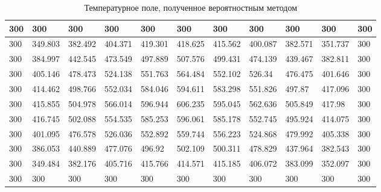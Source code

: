 \documentclass[12pt, a4paper]{article}
\begin{document}
\begin{table}[ht]
	\small
	\caption{Температурное поле, полученное вероятностным методом}
	\label{tbl:probability}
	\begin{tabular}{|l|l|l|l|l|l|l|l|l|l|l|}
		\hline
		300 & 300     & 300     & 300     & 300     & 300     & 300     & 300     & 300     & 300     & 300 \\ \hline
		300 & 349.803 & 382.492 & 404.371 & 419.301 & 418.625 & 415.562 & 400.087 & 382.571 & 351.737 & 300 \\ \hline
		300 & 384.997 & 442.545 & 473.549 & 497.889 & 507.576 & 499.431 & 474.139 & 439.467 & 382.811 & 300 \\ \hline
		300 & 405.146 & 478.473 & 524.138 & 551.763 & 564.484 & 552.102 & 526.34  & 476.475 & 401.646 & 300 \\ \hline
		300 & 414.462 & 498.766 & 552.034 & 584.046 & 594.611 & 583.298 & 551.826 & 497.87  & 417.096 & 300 \\ \hline
		300 & 415.855 & 504.978 & 566.014 & 596.944 & 606.235 & 595.045 & 562.636 & 505.849 & 417.98  & 300 \\ \hline
		300 & 416.745 & 502.088 & 554.535 & 585.253 & 596.061 & 585.178 & 552.745 & 495.924 & 414.075 & 300 \\ \hline
		300 & 401.095 & 476.578 & 526.036 & 552.892 & 559.744 & 556.223 & 524.868 & 479.992 & 405.338 & 300 \\ \hline
		300 & 386.053 & 440.889 & 477.076 & 496.92  & 502.109 & 500.311 & 478.829 & 437.964 & 382.543 & 300 \\ \hline
		300 & 349.484 & 382.176 & 405.716 & 415.766 & 414.571 & 415.185 & 406.072 & 383.099 & 352.097 & 300 \\ \hline
		300 & 300     & 300     & 300     & 300     & 300     & 300     & 300     & 300     & 300     & 300 \\ \hline
	\end{tabular}
\end{table}
\end{document}
